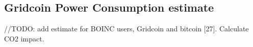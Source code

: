 \subsection{Gridcoin Power Consumption estimate}

//TODO: add estimate for BOINC users, Gridcoin and bitcoin [27]. Calculate CO2 impact. 